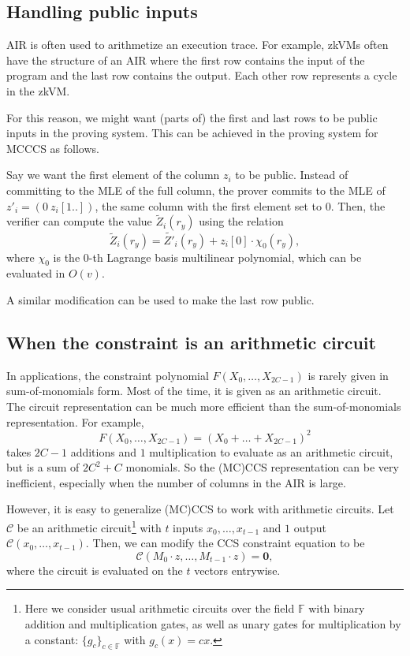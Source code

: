 \documentclass[a4paper]{article}
\begin{document}
\subsection*{Handling public inputs}

AIR is often used to arithmetize an execution trace. For example, zkVMs often have the structure of an AIR where the first row contains the input of the program and the last row contains the output. Each other row represents a cycle in the zkVM. 

For this reason, we might want (parts of) the first and last rows to be public inputs in the proving system. This can be achieved in the proving system for MCCCS as follows. 

Say we want the first element of the column $z_i$ to be public. Instead of committing to the MLE of the full column, the prover commits to the MLE of $z'_i = (0 \ z_i[1..])$, the same column with the first element set to 0. Then, the verifier can compute the value $\widetilde{Z}_i(r_y)$ using the relation
$$\widetilde{Z}_i(r_y) = \widetilde{Z'}_i(r_y) + z_i[0]\cdot \chi_0(r_y),$$
where $\chi_0$ is the 0-th Lagrange basis multilinear polynomial, which can be evaluated in $O(v)$. 

A similar modification can be used to make the last row public.

\subsection*{When the constraint is an arithmetic circuit}

In applications, the constraint polynomial $F(X_0,\dots, X_{2C-1})$ is rarely given in sum-of-monomials form. Most of the time, it is given as an arithmetic circuit. The circuit representation can be much more efficient than the sum-of-monomials representation. For example, 
$$ F(X_0,\dots, X_{2C-1}) = (X_0 + \dots + X_{2C-1})^2$$
takes $2C-1$ additions and $1$ multiplication to evaluate as an arithmetic circuit, but is a sum of $2C^2+C$ monomials. So the (MC)CCS representation can be very inefficient, especially when the number of columns in the AIR is large.

However, it is easy to generalize (MC)CCS to work with arithmetic circuits. Let $\mathcal{C}$ be an arithmetic circuit\footnote{Here we consider usual arithmetic circuits over the field $\mathbb{F}$ with binary addition and multiplication gates, as well as unary gates for multiplication by a constant: $\{g_c\}_{c\in \mathbb{F}}$ with $g_c(x) = cx$.} with $t$ inputs $x_0,\dots,x_{t-1}$ and $1$ output $\mathcal{C}(x_0,\dots,x_{t-1})$. Then, we can modify the CCS constraint equation to be
$$
\mathcal{C}(M_0\cdot z, \dots, M_{t-1}\cdot z) = \mathbf{0},
$$
where the circuit is evaluated on the $t$ vectors entrywise.
\end{document}
